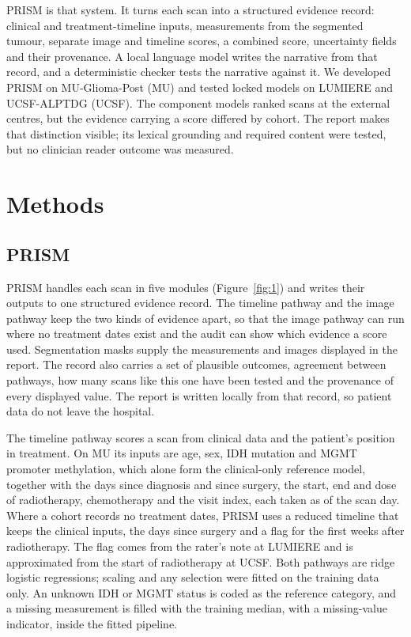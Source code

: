 \documentclass[largeformat]{interact} %
\begin{document}
PRISM is that system. It turns each scan into a structured evidence record: clinical and treatment-timeline inputs,
measurements from the segmented tumour, separate image and timeline scores, a combined score, uncertainty fields and
their provenance. A local language model writes the narrative from that record, and a deterministic checker tests the
narrative against it. We developed PRISM on MU-Glioma-Post (MU) and tested locked models on LUMIERE and
UCSF-ALPTDG (UCSF). The component models ranked scans at the external centres, but the evidence carrying a score
differed by cohort. The report makes that distinction visible; its lexical grounding and required content were tested,
but no clinician reader outcome was measured.

\section{Methods}\label{sec:2}

\subsection{PRISM}\label{sec:2.1}

PRISM handles each scan in five modules (Figure~\ref{fig:1}) and writes their outputs to one structured evidence
record. The timeline pathway and the image pathway keep the two kinds of evidence apart, so that the image pathway
can run where no treatment dates exist and the audit can show which evidence a score used. Segmentation masks supply
the measurements and images displayed in the report. The record also carries a set of plausible outcomes, agreement
between pathways, how many scans like this one have been tested and the provenance of every displayed value. The
report is written locally from that record, so patient data do not leave the hospital.

The timeline pathway scores a scan from clinical data and the patient's position in treatment. On MU its inputs are
age, sex, IDH mutation and MGMT promoter methylation, which alone form the clinical-only reference model, together
with the days since diagnosis and since surgery, the start, end and dose of radiotherapy, chemotherapy and the visit
index, each taken as of the scan day. Where a cohort records no treatment dates, PRISM uses a reduced timeline that
keeps the clinical inputs, the days since surgery and a flag for the first weeks after radiotherapy. The flag comes
from the rater's note at LUMIERE and is approximated from the start of radiotherapy at UCSF. Both pathways are ridge
logistic regressions; scaling and any selection were fitted on the training data only. An unknown IDH or MGMT status
is coded as the reference category, and a missing measurement is filled with the training median, with a
missing-value indicator, inside the fitted pipeline.
\end{document}
